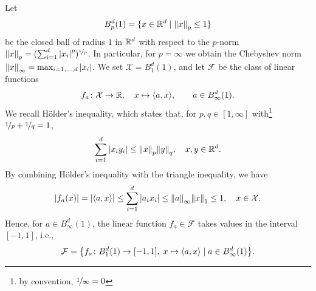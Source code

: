 \begin{example}
\label{ex: linear functions f_a}
Let
\[
    B_p^d(1) = \{x \in \mathbb{R}^d \mathrel{|} \norm{x}_p \leq 1\}
\]
be the closed ball of radius $1$ in $\mathbb{R}^d$ with respect to the $p$-norm $\norm{x}_p = (\sum_{i=1}^d \abs{x_i}^p)^{\nicefrac{1}{p}}$. In particular, for $p = \infty$ we obtain the Chebyshev norm $\norm{x}_{\infty} = \max_{i=1, \dots, d} \abs{x_i}$. We set $\mathcal{X} = B_1^d(1)$, and let $\mathcal{F}$ be the class of linear functions
\[
    f_a \colon \mathcal{X} \to \mathbb{R}, \quad x \mapsto \langle a, x \rangle, \qquad a \in B_{\infty}^d(1).
\]
We recall H{\"o}lder's inequality, which states that, for $p, q \in [1, \infty]$ with\footnote{by convention, $\nicefrac{1}{\infty} = 0$} $\nicefrac{1}{p} + \nicefrac{1}{q} = 1$,
\[
    \sum_{i=1}^d \abs{x_i y_i} \leq \norm{x}_p \norm{y}_q, \quad x, y \in \mathbb{R}^d.
\]
By combining H{\"o}lder's inequality with the triangle inequality, we have
\[
    \abs{f_a(x)} = \abs{\langle a, x \rangle} \leq \sum_{i=1}^d \abs{a_i x_i} \leq \norm{a}_{\infty} \norm{x}_1 \leq 1, \quad x \in \mathcal{X}.
\]
Hence, for $a \in B_{\infty}^d(1)$, the linear function $f_a \in \mathcal{F}$ takes values in the interval $[-1, 1]$, i.e.,
\begin{equation}
\label{eq: family of linear functions f_a}
    \mathcal{F} = \set{f_a \colon B_1^d(1) \to [-1, 1], \; x \mapsto \langle a, x \rangle \with a \in B_{\infty}^d(1)}.
\end{equation}
\end{example}
